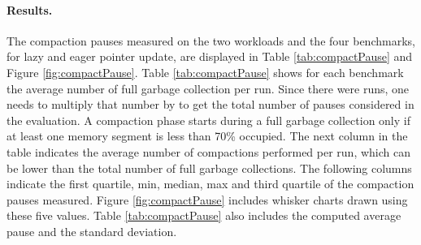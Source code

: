 \documentclass[sigplan,10pt,screen]{acmart}\settopmatter{printfolios=true,printccs=true,printacmref=true}
\begin{document}

\paragraph{Results.} 
The compaction pauses measured on the two workloads and the four benchmarks, for lazy and eager pointer update, are displayed in Table \ref{tab:compactPause} and Figure \ref{fig:compactPause}. 
Table  \ref{tab:compactPause} shows for each benchmark the average number of full garbage collection per run. Since there were \numRuns runs, one needs to multiply that number by \numRuns to get the total number of pauses considered in the evaluation. A compaction phase starts during a full garbage collection only if at least one memory segment is less than 70\% occupied. The next column in the table indicates the average number of compactions performed per run, which can be lower than the total number of full garbage collections. The following columns indicate the first quartile, min, median, max and third quartile of the compaction pauses measured.  Figure \ref{fig:compactPause} includes whisker charts drawn using these five values. Table \ref{tab:compactPause} also includes the computed average pause and the standard deviation.%
\end{document}
